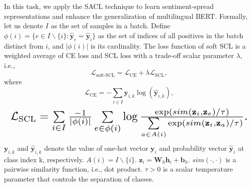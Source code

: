 \documentclass[11pt]{article}
\begin{document}
In this task, we apply the SACL technique to learn sentiment-spread representations and enhance the generalization of multilingual BERT. 
Formally, let us denote $I$ as the set of samples in a batch.
Define $\phi(i) = \{ e \in I \backslash \{i\}: \hat{\mathbf{y}}_e =\hat{\mathbf{y}}_i \}$ as the set of indices of all positives in the batch distinct from $i$, and $|\phi(i)|$ is its cardinality. 
The loss function of soft SCL is a weighted average of CE loss and SCL loss with a trade-off scalar parameter $\lambda$, i.e., 
\begin{equation}
\mathcal{L}_{\text{soft-SCL}} = \mathcal{L}_{\text{CE}} + \lambda \mathcal{L}_{\text{SCL}},  \label{eq:softscl}
\end{equation}
where 
\begin{equation}
\mathcal{L}_{\text{CE}} = -   \sum\limits_{i \in I} {\mathbf{y}}_{i,k} \log (\hat{\mathbf{y}}_{i,k}), 
  \end{equation}   
\begin{equation}
\resizebox{0.99\linewidth}{!}{$
    \mathcal{L}_{\text{SCL}} = \sum\limits_{i \in I} \frac{-1}{|\phi(i)|}  \sum\limits_{e \in \phi(i)} \log \frac{\exp(sim(\mathbf{z}_i,\mathbf{z}_e) / \tau)  } {\sum\limits_{a\in A(i)} \exp(sim(\mathbf{z}_i, \mathbf{z}_a) / \tau) }.
    $}
\end{equation}
$\mathbf{y}_{i,k}$ and $\hat{\mathbf{y}}_{i,k}$ denote the value of one-hot vector $\mathbf{y}_{i}$ and probability vector $\hat{\mathbf{y}}_{i}$ at class index k, respectively.
$A(i) = I \backslash \{i\} $. 
$\mathbf{z}_i = \mathbf{W}_h \mathbf{h}_i + \mathbf{b}_h$.
$sim(\cdot, \cdot)$ is a pairwise similarity function, 
i.e., dot product.
$\tau > 0$ is a scalar temperature parameter that controls the separation of classes. 
\end{document}
